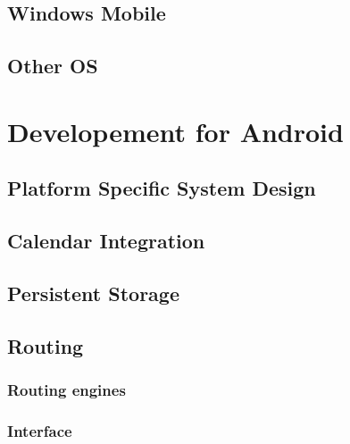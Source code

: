 \documentclass[11pt,a4paper]{scrreprt}
\begin{document}
\section{Windows Mobile} %
\label{sec:win_mobile}


\section{Other OS} %
\label{sec:other_os}


\chapter{Developement for Android} %
\label{chp:android}
%

\section{Platform Specific System Design} %
\label{sec:android_desing}


\section{Calendar Integration} %
\label{sec:android_calendar}


\section{Persistent Storage} %
\label{sec:android_pers_storage}


\section{Routing} %
\label{sec:android_routing}


\subsection{Routing engines}
\label{sub:routing_engines}


\subsection{Interface} %
\label{sub:routing_interface}

\end{document}
